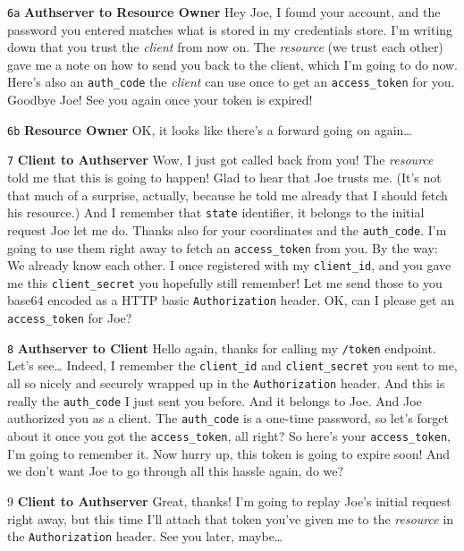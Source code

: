 \begin{description}
    \item \texttt{6a} \textbf{Authserver to Resource Owner} Hey Joe, I found your account, and the password you entered matches what is stored in my credentials store. I'm writing down that you trust the \textit{client} from now on. The \textit{resource} (we trust each other) gave me a note on how to send you back to the client, which I'm going to do now. Here's also an \texttt{auth\_code} the \textit{client} can use once to get an \texttt{access\_token} for you. Goodbye Joe! See you again once your token is expired!
    \item \texttt{6b} \textbf{Resource Owner} OK, it looks like there's a forward going on again…
    \item \texttt{7} \textbf{Client to Authserver} Wow, I just got called back from you! The \textit{resource} told me that this is going to happen! Glad to hear that Joe trusts me. (It's not that much of a surprise, actually, because he told me already that I should fetch his resource.) And I remember that \texttt{state} identifier, it belongs to the initial request Joe let me do. Thanks also for your coordinates and the \texttt{auth\_code}. I'm going to use them right away to fetch an \texttt{access\_token} from you. By the way: We already know each other. I once registered with my \texttt{client\_id}, and you gave me this \texttt{client\_secret} you hopefully still remember! Let me send those to you base64 encoded as a HTTP basic \texttt{Authorization} header. OK, can I please get an \texttt{access\_token} for Joe?
    \item \texttt{8} \textbf{Authserver to Client} Hello again, thanks for calling my \texttt{/token} endpoint. Let's see… Indeed, I remember the \texttt{client\_id} and \texttt{client\_secret} you sent to me, all so nicely and securely wrapped up in the \texttt{Authorization} header. And this is really the \texttt{auth\_code} I just sent you before. And it belongs to Joe. And Joe authorized you as a client. The \texttt{auth\_code} is a one-time password, so let's forget about it once you got the \texttt{access\_\-token}, all right? So here's your \texttt{access\_token}, I'm going to remember it. Now hurry up, this token is going to expire soon! And we don't want Joe to go through all this hassle again, do we?
    \item 9 \textbf{Client to Authserver} Great, thanks! I'm going to replay Joe's initial request right away, but this time I'll attach that token you've given me to the \textit{resource} in the \texttt{Authorization} header. See you later, maybe…
\end{description}


